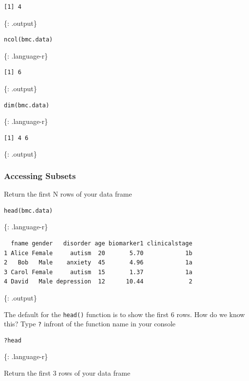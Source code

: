 \documentclass[]{article}
\begin{document}
\begin{verbatim}
[1] 4
\end{verbatim}

\{: .output\}

\begin{verbatim}
ncol(bmc.data)
\end{verbatim}

\{: .language-r\}

\begin{verbatim}
[1] 6
\end{verbatim}

\{: .output\}

\begin{verbatim}
dim(bmc.data)
\end{verbatim}

\{: .language-r\}

\begin{verbatim}
[1] 4 6
\end{verbatim}

\{: .output\}

\subsubsection{Accessing Subsets}\label{accessing-subsets}

Return the first N rows of your data frame

\begin{verbatim}
head(bmc.data)
\end{verbatim}

\{: .language-r\}

\begin{verbatim}
  fname gender   disorder age biomarker1 clinicalstage
1 Alice Female     autism  20       5.70            1b
2   Bob   Male    anxiety  45       4.96            1a
3 Carol Female     autism  15       1.37            1a
4 David   Male depression  12      10.44             2
\end{verbatim}

\{: .output\}

The default for the \texttt{head()} function is to show the first 6
rows. How do we know this? Type \texttt{?} infront of the function name
in your console

\begin{verbatim}
?head
\end{verbatim}

\{: .language-r\}

Return the first 3 rows of your data frame
\end{document}
